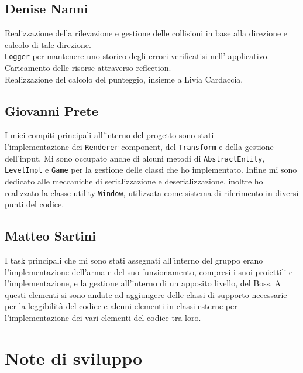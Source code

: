 \documentclass[a4paper,12pt]{report}
\begin{document}
\subsection{Denise Nanni}
Realizzazione della rilevazione e gestione delle collisioni in base alla direzione e calcolo di tale direzione.\\
\texttt{Logger} per mantenere uno storico degli errori verificatisi nell' applicativo.\\
Caricamento delle risorse attraverso reflection.\\
Realizzazione del calcolo del punteggio, insieme a Livia Cardaccia.\\

\subsection{Giovanni Prete}
I miei compiti principali all'interno del progetto sono stati\\
l'implementazione dei \texttt{Renderer} component, del \texttt{Transform} e della gestione dell'input. Mi sono occupato anche di alcuni metodi di \texttt{AbstractEntity}, \texttt{LevelImpl} e \texttt{Game} per la gestione delle classi che ho implementato. Infine mi sono dedicato alle meccaniche di serializzazione e deserializzazione, inoltre ho realizzato la classe utility \texttt{Window}, utilizzata come sistema di riferimento in diversi punti del codice.

\subsection{Matteo Sartini}
I task principali che mi sono stati assegnati all’interno del gruppo erano l’implementazione dell’arma e del suo funzionamento, compresi i suoi proiettili e l’implementazione, e la gestione all’interno di un apposito livello, del Boss. A questi elementi si sono andate ad aggiungere delle classi di supporto necessarie per la leggibilità del codice e alcuni elementi in classi esterne per l’implementazione dei vari elementi del codice tra loro.

\newpage
\section{Note di sviluppo}
\end{document}
